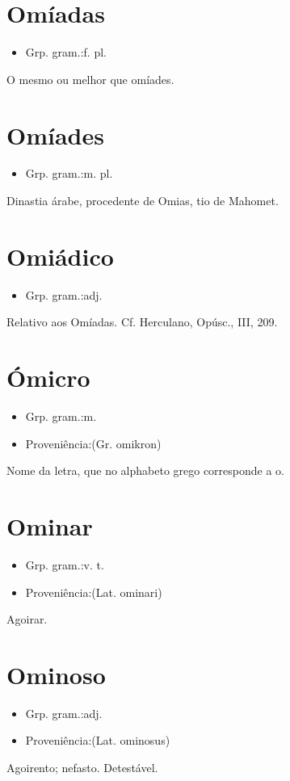 \section{Omíadas}
\begin{itemize}
\item {Grp. gram.:f. pl.}
\end{itemize}
O mesmo ou melhor que \textunderscore omíades\textunderscore .
\section{Omíades}
\begin{itemize}
\item {Grp. gram.:m. pl.}
\end{itemize}
Dinastia árabe, procedente de Omias, tio de Mahomet.
\section{Omiádico}
\begin{itemize}
\item {Grp. gram.:adj.}
\end{itemize}
Relativo aos Omíadas. Cf. Herculano, \textunderscore Opúsc.\textunderscore , III, 209.
\section{Ómicro}
\begin{itemize}
\item {Grp. gram.:m.}
\end{itemize}
\begin{itemize}
\item {Proveniência:(Gr. \textunderscore omikron\textunderscore )}
\end{itemize}
Nome da letra, que no alphabeto grego corresponde a \textunderscore o\textunderscore .
\section{Ominar}
\begin{itemize}
\item {Grp. gram.:v. t.}
\end{itemize}
\begin{itemize}
\item {Proveniência:(Lat. \textunderscore ominari\textunderscore )}
\end{itemize}
Agoirar.
\section{Ominoso}
\begin{itemize}
\item {Grp. gram.:adj.}
\end{itemize}
\begin{itemize}
\item {Proveniência:(Lat. \textunderscore ominosus\textunderscore )}
\end{itemize}
Agoirento; nefasto.
Detestável.
